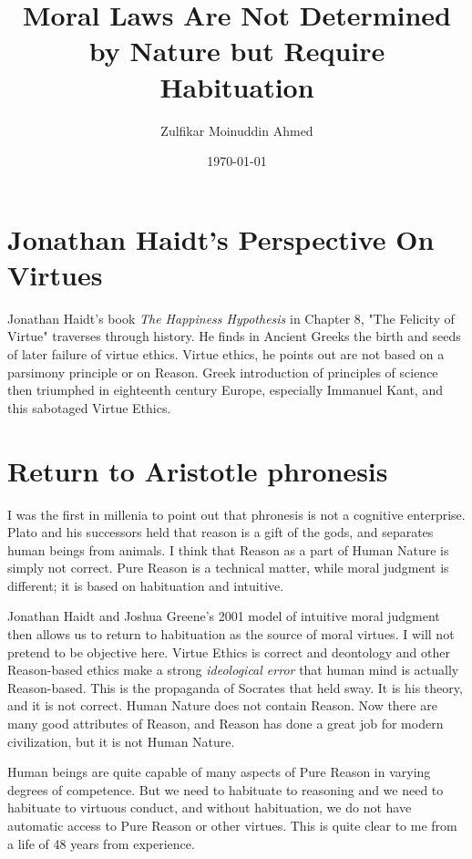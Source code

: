 \documentclass{amsart}
\title{Moral Laws Are Not Determined by Nature but Require Habituation}
\author{Zulfikar Moinuddin Ahmed}
\date{\today}
\begin{document}
\maketitle

\section{Jonathan Haidt's Perspective On Virtues}

Jonathan Haidt's book {\em The Happiness Hypothesis} in Chapter 8, "The Felicity of Virtue" traverses through history.  He finds in Ancient Greeks the birth and seeds of later failure of virtue ethics.  Virtue ethics, he points out are not based on a parsimony principle or on Reason.  Greek introduction of principles of science then triumphed in eighteenth century Europe, especially Immanuel Kant, and this sabotaged Virtue Ethics. 

\section{Return to Aristotle phronesis}

I was the first in millenia to point out that phronesis is not a cognitive enterprise.  Plato and his successors held that reason is a gift of the gods, and separates human beings from animals.  I think that Reason as a part of Human Nature is simply not correct.  Pure Reason is a technical matter, while moral judgment is different; it is based on habituation and intuitive.

Jonathan Haidt and Joshua Greene's 2001 model of intuitive moral judgment then allows us to return to habituation as the source of moral virtues.  I will not pretend to be objective here.  Virtue Ethics is correct and deontology and other Reason-based ethics make a strong {\em ideological error} that human mind is actually Reason-based.  This is the propaganda of Socrates that held sway. It is his theory, and it is not correct.  Human Nature does not contain Reason.  Now there are many good attributes of Reason, and Reason has done a great job for modern civilization, but it is not Human Nature.

Human beings are quite capable of many aspects of Pure Reason in varying degrees of competence.  But we need to habituate to reasoning and we need to habituate to virtuous conduct, and without habituation, we do not have automatic access to Pure Reason or other virtues.  This is quite clear to me from a life of 48 years from experience.  
\end{document}
